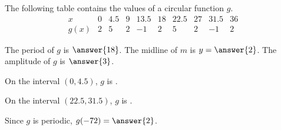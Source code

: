 \documentclass{ximera}
\author{Kenneth Berglund}
\begin{document}
\begin{exercise}
The following table contains the values of a circular function $g$. 
$$
\begin{array}{cccccccccc}
x&0&4.5&9&13.5&18&22.5&27&31.5&36\\
\hline
g(x)&2&5&2&-1&2&5&2&-1&2
\end{array}
$$

The period of $g$ is $\answer{18}$. The midline of $m$ is $y = \answer{2}$. The amplitude of $g$ is $\answer{3}$.

On the interval $(0, 4.5)$, $g$ is .

On the interval $(22.5, 31.5)$, $g$ is .

Since $g$ is periodic, $g(-72) = \answer{2}$. 


\end{exercise}
\end{document}
